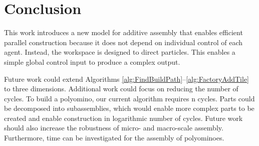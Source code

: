
\section{Conclusion}\label{sec:Conclusion}

This work introduces a new model for additive assembly that enables efficient parallel construction because it does not depend on individual control of each agent.
Instead,   the workspace is designed  to direct particles. 
 This enables  a simple global control input to produce a complex output.

  
 
  

Future work could extend Algorithms \ref{alg:FindBuildPath}--\ref{alg:FactoryAddTile} to three dimensions. 
Additional work could focus on reducing the number of cycles. To build a polyomino, our current algorithm requires n cycles.  
Parts could be decomposed into subassemblies, which would enable more complex parts to be created and enable construction in logarithmic number of cycles. Future work should also increase the robustness of micro- and macro-scale assembly. Furthermore, time can be investigated for the assembly of polyominoes. 

    
